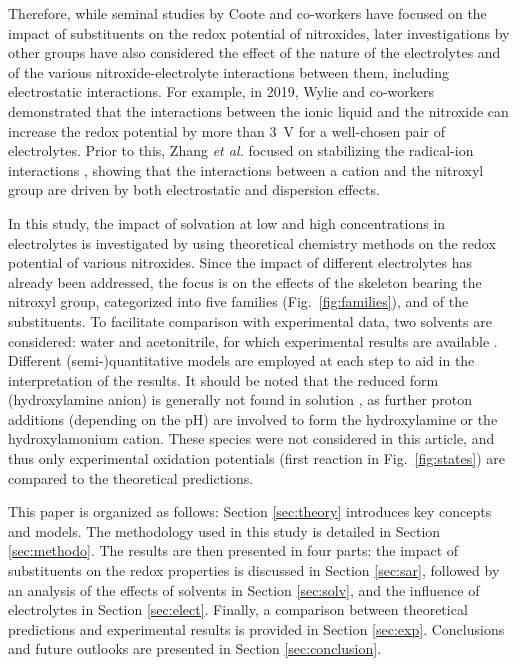 \documentclass[review,preprint]{elsarticle}
\begin{document}
Therefore, while seminal studies by Coote and co-workers \cite{hodgsonOneElectronOxidationReduction2007,blincoExperimentalTheoreticalStudies2008} have focused on the impact of substituents on the redox potential of nitroxides, later investigations by other groups have also considered the effect of the nature of the electrolytes and of the various nitroxide-electrolyte interactions between them, including electrostatic interactions. For example, in 2019, Wylie and co-workers \cite{wylieImprovedPerformanceAllOrganic2019a,wylieIncreasedStabilityNitroxide2019b} demonstrated that the interactions between the ionic liquid and the nitroxide can increase the redox potential by more than \SI{3}{\volt} for a well-chosen pair of electrolytes. Prior to this, Zhang \textit{et al.} focused on stabilizing the radical-ion interactions \cite{zhangInteractionsImidazoliumBasedIonic2016,zhangEffectHeteroatomFunctionality2018}, showing that the interactions between a cation and the nitroxyl group are driven by both electrostatic and dispersion effects.

In this study, the impact of solvation at low and high concentrations in electrolytes is investigated by using theoretical chemistry methods on the redox potential of various nitroxides. Since the impact of different electrolytes has already been addressed, the focus is on the effects of the skeleton bearing the nitroxyl group, categorized into five families (Fig.~\ref{fig:families}), and of the substituents. To facilitate comparison with experimental data, two solvents are considered: water and acetonitrile, for which experimental results are available \cite{morrisChemicalElectrochemicalReduction1991,goldsteinStructureActivityRelationship2006,blincoExperimentalTheoreticalStudies2008,zhangEffectHeteroatomFunctionality2018}. 
Different (semi-)quantitative models are employed at each step to aid in the interpretation of the results. It should be noted that the reduced form (hydroxylamine anion) is generally not found in solution \cite{israeliKineticsMechanismComproportionation2005}, as further proton additions (depending on the pH) are involved to form the hydroxylamine or the hydroxylamonium cation. These species were not considered in this article, and thus only experimental oxidation potentials (first reaction in  Fig.~\ref{fig:states}) are compared to the theoretical predictions.

This paper is organized as follows: Section \ref{sec:theory} introduces key concepts and models. The methodology used in this study is detailed in Section \ref{sec:methodo}. The results are then presented in four parts: the impact of substituents on the redox properties is discussed in Section \ref{sec:sar}, followed by an analysis of the effects of solvents in Section \ref{sec:solv}, and the influence of electrolytes in Section \ref{sec:elect}. Finally, a comparison between theoretical predictions and experimental results is provided in Section \ref{sec:exp}. Conclusions and future outlooks are presented in Section \ref{sec:conclusion}.
\end{document}
